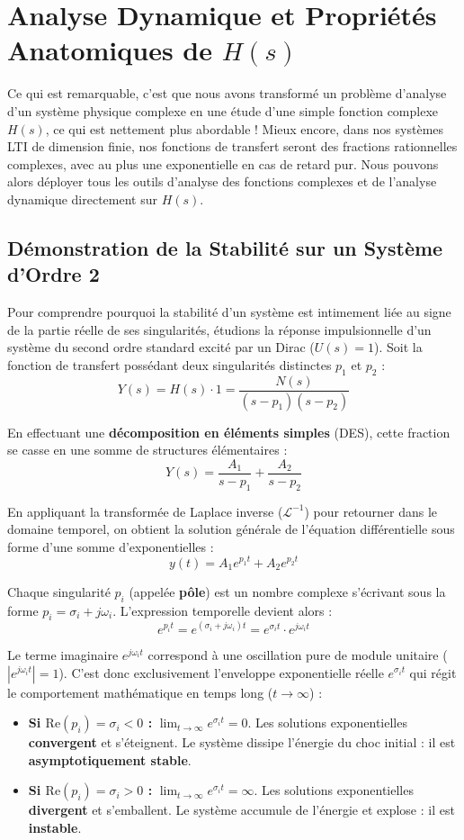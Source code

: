 \documentclass[11pt,a4paper]{report}
\begin{document}
\section{Analyse Dynamique et Propriétés Anatomiques de $H(s)$}

Ce qui est remarquable, c'est que nous avons transformé un problème d'analyse d'un système physique complexe en une étude d'une simple fonction complexe $H(s)$, ce qui est nettement plus abordable ! Mieux encore, dans nos systèmes LTI de dimension finie, nos fonctions de transfert seront des fractions rationnelles complexes, avec au plus une exponentielle en cas de retard pur. Nous pouvons alors déployer tous les outils d'analyse des fonctions complexes et de l'analyse dynamique directement sur $H(s)$.

\subsection{Démonstration de la Stabilité sur un Système d'Ordre 2}

Pour comprendre pourquoi la stabilité d'un système est intimement liée au signe de la partie réelle de ses singularités, étudions la réponse impulsionnelle d'un système du second ordre standard excité par un Dirac ($U(s) = 1$). Soit la fonction de transfert possédant deux singularités distinctes $p_1$ et $p_2$ :
\[ Y(s) = H(s) \cdot 1 = \frac{N(s)}{(s - p_1)(s - p_2)} \]

En effectuant une \textbf{décomposition en éléments simples} (DES), cette fraction se casse en une somme de structures élémentaires :
\[ Y(s) = \frac{A_1}{s - p_1} + \frac{A_2}{s - p_2} \]

En appliquant la transformée de Laplace inverse ($\mathcal{L}^{-1}$) pour retourner dans le domaine temporel, on obtient la solution générale de l'équation différentielle sous forme d'une somme d'exponentielles :
\[ y(t) = A_1 e^{p_1 t} + A_2 e^{p_2 t} \]

Chaque singularité $p_i$ (appelée \textbf{pôle}) est un nombre complexe s'écrivant sous la forme $p_i = \sigma_i + j\omega_i$. L'expression temporelle devient alors :
\[ e^{p_i t} = e^{(\sigma_i + j\omega_i)t} = e^{\sigma_i t} \cdot e^{j\omega_i t} \]

Le terme imaginaire $e^{j\omega_i t}$ correspond à une oscillation pure de module unitaire ($|e^{j\omega_i t}| = 1$). C'est donc exclusivement l'enveloppe exponentielle réelle $e^{\sigma_i t}$ qui régit le comportement mathématique en temps long ($t \to \infty$) :
\begin{itemize}
    \item \textbf{Si $\text{Re}(p_i) = \sigma_i < 0$ :} $\lim_{t \to \infty} e^{\sigma_i t} = 0$. Les solutions exponentielles \textbf{convergent} et s'éteignent. Le système dissipe l'énergie du choc initial : il est \textbf{asymptotiquement stable}.
    \item \textbf{Si $\text{Re}(p_i) = \sigma_i > 0$ :} $\lim_{t \to \infty} e^{\sigma_i t} = \infty$. Les solutions exponentielles \textbf{divergent} et s'emballent. Le système accumule de l'énergie et explose : il est \textbf{instable}.
\end{itemize}
\end{document}
